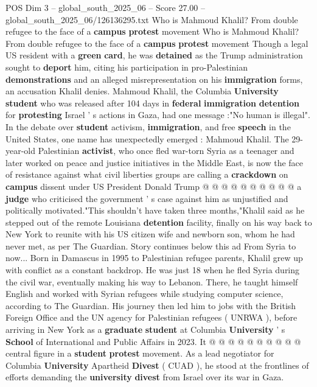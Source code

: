 \begin{textsample}{POS Dim 3 – global\_south\_2025\_06 – Score 27.00 – global\_south\_2025\_06/126136295.txt}  \label{ex:f3_pos_199}
Who is Mahmoud Khalil?
From double refugee to the face of a \textbf{campus} \textbf{protest} movement Who is Mahmoud Khalil?
From double refugee to the face of a \textbf{campus} \textbf{protest} movement Though a legal US resident with a \textbf{green} \textbf{card}, he was \textbf{detained} as the Trump administration sought to \textbf{deport} him, citing his participation in pro-Palestinian \textbf{demonstrations} and an alleged misrepresentation on his \textbf{immigration} forms, an accusation Khalil denies.
Mahmoud Khalil, the Columbia \textbf{University} \textbf{student} who was released after 104 days in \textbf{federal} \textbf{immigration} \textbf{detention} for \textbf{protesting} Israel ' s actions in Gaza, had one message :"No human is illegal".
In the debate over \textbf{student} activism, \textbf{immigration}, and free \textbf{speech} in the United States, one name has unexpectedly emerged : Mahmoud Khalil.
The 29-year-old Palestinian \textbf{activist}, who once fled war-torn Syria as a teenager and later worked on peace and justice initiatives in the Middle East, is now the face of resistance against what civil liberties groups are calling a \textbf{crackdown} on \textbf{campus} dissent under US President Donald Trump @ @ @ @ @ @ @ @ @ @ a \textbf{judge} who criticised the government ' s case against him as unjustified and politically motivated."This shouldn't have taken three months,"Khalil said as he stepped out of the remote Louisiana \textbf{detention} facility, finally on his way back to New York to reunite with his US citizen wife and newborn son, whom he had never met, as per The Guardian.
Story continues below this ad From Syria to now...
Born in Damascus in 1995 to Palestinian refugee parents, Khalil grew up with conflict as a constant backdrop.
He was just 18 when he fled Syria during the civil war, eventually making his way to Lebanon.
There, he taught himself English and worked with Syrian refugees while studying computer science, according to The Guardian.
His journey then led him to jobs with the British Foreign Office and the UN agency for Palestinian refugees ( UNRWA ), before arriving in New York as a \textbf{graduate} \textbf{student} at Columbia \textbf{University} ' s \textbf{School} of International and Public Affairs in 2023.
It @ @ @ @ @ @ @ @ @ @ central figure in a \textbf{student} \textbf{protest} movement.
As a lead negotiator for Columbia \textbf{University} Apartheid \textbf{Divest} ( CUAD ), he stood at the frontlines of efforts demanding the \textbf{university} \textbf{divest} from Israel over its war in Gaza.

\end{textsample}
